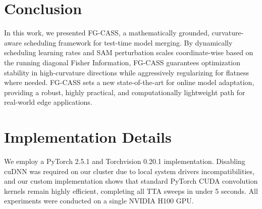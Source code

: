 \documentclass{article}
\theoremstyle{plain}
\theoremstyle{definition}
\theoremstyle{remark}
\begin{document}
\section{Conclusion}
\label{sec:conclusion}
In this work, we presented FG-CASS, a mathematically grounded, curvature-aware scheduling framework for test-time model merging. By dynamically scheduling learning rates and SAM perturbation scales coordinate-wise based on the running diagonal Fisher Information, FG-CASS guarantees optimization stability in high-curvature directions while aggressively regularizing for flatness where needed. FG-CASS sets a new state-of-the-art for online model adaptation, providing a robust, highly practical, and computationally lightweight path for real-world edge applications.




\newpage
\appendix
\section{Implementation Details}
We employ a PyTorch 2.5.1 and Torchvision 0.20.1 implementation. Disabling cuDNN was required on our cluster due to local system drivers incompatibilities, and our custom implementation shows that standard PyTorch CUDA convolution kernels remain highly efficient, completing all TTA sweeps in under 5 seconds. All experiments were conducted on a single NVIDIA H100 GPU.
\end{document}
